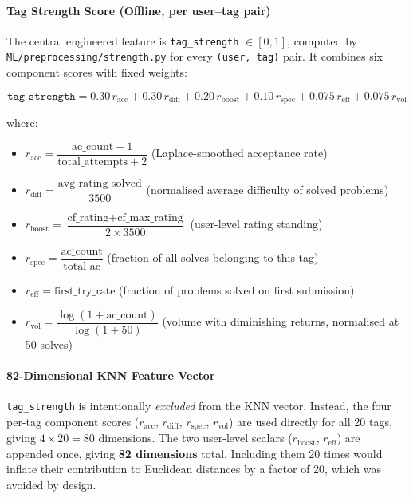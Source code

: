 \documentclass[12pt,a4paper]{article}
\begin{document}
\paragraph{Tag Strength Score (Offline, per user--tag pair)}
The central engineered feature is \texttt{tag\_strength} $\in [0,1]$, computed
by \texttt{ML/preprocessing/strength.py} for every \texttt{(user, tag)} pair.
It combines six component scores with fixed weights:

\[
\texttt{tag\_strength} =
    0.30\,r_{\text{acc}}
  + 0.30\,r_{\text{diff}}
  + 0.20\,r_{\text{boost}}
  + 0.10\,r_{\text{spec}}
  + 0.075\,r_{\text{eff}}
  + 0.075\,r_{\text{vol}}
\]

where:
\begin{itemize}
    \item $r_{\text{acc}} = \dfrac{\text{ac\_count}+1}{\text{total\_attempts}+2}$
          \quad (Laplace-smoothed acceptance rate)
    \item $r_{\text{diff}} = \dfrac{\text{avg\_rating\_solved}}{3500}$
          \quad (normalised average difficulty of solved problems)
    \item $r_{\text{boost}} = \dfrac{\text{cf\_rating} + \text{cf\_max\_rating}}{2 \times 3500}$
          \quad (user-level rating standing)
    \item $r_{\text{spec}} = \dfrac{\text{ac\_count}}{\text{total\_ac}}$
          \quad (fraction of all solves belonging to this tag)
    \item $r_{\text{eff}} = \text{first\_try\_rate}$
          \quad (fraction of problems solved on first submission)
    \item $r_{\text{vol}} = \dfrac{\log(1 + \text{ac\_count})}{\log(1 + 50)}$
          \quad (volume with diminishing returns, normalised at 50 solves)
\end{itemize}

\paragraph{82-Dimensional KNN Feature Vector}
\texttt{tag\_strength} is intentionally \emph{excluded} from the KNN vector.
Instead, the four per-tag component scores ($r_{\text{acc}},\, r_{\text{diff}},
\, r_{\text{spec}},\, r_{\text{vol}}$) are used directly for all 20 tags,
giving $4 \times 20 = 80$ dimensions. The two user-level scalars
($r_{\text{boost}},\, r_{\text{eff}}$) are appended once, giving
\textbf{82 dimensions} total. Including them 20 times would inflate their
contribution to Euclidean distances by a factor of 20, which was avoided by
design.
\end{document}
